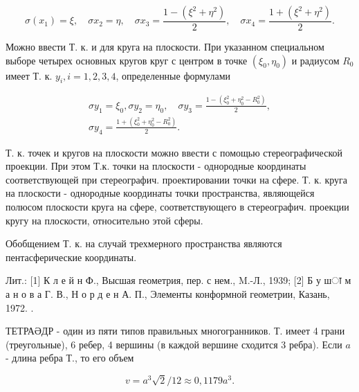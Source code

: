 \documentclass[10pt]{article}
\begin{document}
\[

\sigma\left(x_{1}\right)=\xi, \quad \sigma x_{2}=\eta, \quad \sigma x_{3}=\frac{1-\left(\xi^{2}+\eta^{2}\right)}{2}, \quad \sigma x_{4}=\frac{1+\left(\xi^{2}+\eta^{2}\right)}{2} .

\]



Можно ввести Т. к. и для круга на плоскости. При указанном специальном выборе четырех основных кругов круг с центром в точке $\left(\xi_{0}, \eta_{0}\right)$ и радиусом $R_{0}$ имеет Т. к. $y_{i}, i=1,2,3,4$, определенные формулами



\[

\begin{gathered}

\sigma y_{1}=\xi_{0}, \sigma y_{2}=\eta_{0}, \quad \sigma y_{3}=\frac{1-\left(\xi_{0}^{2}+\eta_{0}^{2}-R_{0}^{2}\right)}{2}, \\

\sigma y_{4}=\frac{1+\left(\xi_{0}^{2}+\eta_{0}^{2}-R_{0}^{2}\right)}{2} .

\end{gathered}

\]



Т. к. точек и кругов на плоскости можно ввести с помощью стереографической проекции. При этом Т.к. точки на плоскости - однородные координаты соответствующей при стереографич. проектировании точки на сфере. Т. к. круга на плоскости - однородные координаты точки пространства, являющейся полюсом плоскости круга на сфере, соответствующего в стереографич. проекции кругу на плоскости, относительно этой сферы.



Обобщением Т. к. на случай трехмерного пространства являются пентасферические координаты.



Лит.: [1] К л е й н Ф., Высшая геометрия, пер. с нем., M.-Л., 1939; [2] Б у шा м а н о в а Г. В., Н о р д е н А. П., Элементы конформной геометрии, Казань, 1972. .



ТЕТРАӘДР - один из пяти типов правильных многогранников. Т. имеет 4 грани (треугольные), 6 ребер, 4 вершины (в каждой вершине сходится 3 ребра). Если $a$ - длина ребра Т., то его объем



\[

v=a^{3} \sqrt{2} / 12 \approx 0,1179 a^{3} .

\]
\end{document}
